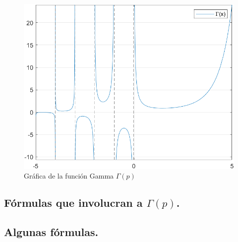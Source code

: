 \begin{figure}[H]
   \centering
   \includegraphics[scale=0.7]{Imagenes/Plot_Gamma.png}
   \caption{Gráfica de la función Gamma $\Gamma (p)$}
   \label{fig:figura_plot_gamma}
\end{figure}

\subsection{Fórmulas que involucran a \texorpdfstring{$\Gamma (p)$}{G (p)}.}

\subsection*{Algunas fórmulas.}

